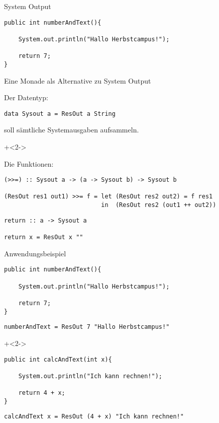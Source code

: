 \begin{frame}[fragile]{System Output}

\begin{lstlisting}
public int numberAndText(){

    System.out.println("Hallo Herbstcampus!");
    
    return 7;
}
\end{lstlisting}

\end{frame}


\begin{frame}[fragile]{Eine Monade als Alternative zu System Output}

Der Datentyp:
\begin{lstlisting}
data Sysout a = ResOut a String
\end{lstlisting}

soll sämtliche Systemausgaben aufsammeln.

\onslide+<2->
~

Die Funktionen:
\begin{lstlisting}
(>>=) :: Sysout a -> (a -> Sysout b) -> Sysout b

(ResOut res1 out1) >>= f = let (ResOut res2 out2) = f res1
                           in  (ResOut res2 (out1 ++ out2))
\end{lstlisting}


\begin{lstlisting}
return :: a -> Sysout a

return x = ResOut x ""
\end{lstlisting}


\end{frame}



\begin{frame}[fragile]{Anwendungsbeispiel}
\begin{lstlisting}
public int numberAndText(){

    System.out.println("Hallo Herbstcampus!");
    
    return 7;
}
\end{lstlisting}

\begin{lstlisting}
numberAndText =	ResOut 7 "Hallo Herbstcampus!"
\end{lstlisting}

\onslide+<2->

\begin{lstlisting}
public int calcAndText(int x){

    System.out.println("Ich kann rechnen!");
    
    return 4 + x;
}
\end{lstlisting}

\begin{lstlisting}
calcAndText x =	ResOut (4 + x) "Ich kann rechnen!"
\end{lstlisting}

\end{frame}


